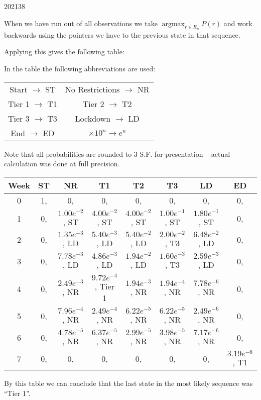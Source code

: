 \documentclass[10pt,\jkfside,a4paper]{article}
\DeclareMathOperator*{\argmax}{argmax}
\begin{document}
\begin{examquestion}{2021}{3}{8}
\begin{enumerate}
When we have run out of all observations we take $\argmax_{r \in R_n} P(r)$ and work backwards using the 
pointers we have to the previous state in that sequence.

Applying this gives the following table:

In the table the following abbreviations are used:

\begin{tabular}{c c}
Start $\rightarrow$ ST & No Restrictions $\rightarrow$ NR \\
Tier 1 $\rightarrow$ T1 & Tier 2 $\rightarrow$ T2 \\
Tier 3 $\rightarrow$ T3 & Lockdown $\rightarrow$ LD \\
End $\rightarrow$ ED & $\times 10^{n} \rightarrow e^{n}$ \\
\end{tabular}

Note that all probabilities are rounded to 3 S.F. for presentation -- actual calculation was 
done at full precision.

\begin{tabular}{|c| c c c c c c c|}
\hline
Week & ST & NR & T1 & T2 & T3 & LD & ED \\
\hline
0 & 1, \null & 0, \null & 0, \null & 0, \null & 0, \null & 0, \null & 0, \null \\
1 & 0, \null & $1.00e^{-2}$, ST & $4.00e^{-2}$, ST & $4.00e^{-2}$, ST & $1.00e^{-1}$, ST & $1.80e^{-1}$, ST & 0, \null \\
2 & 0, \null & $1.35e^{-3}$, LD & $5.40e^{-3}$, LD & $5.40e^{-2}$, LD & $2.00e^{-2}$, T3 & $6.48e^{-2}$, LD & 0, \null \\
3 & 0, \null & $7.78e^{-3}$, LD & $4.86e^{-3}$, LD & $1.94e^{-2}$, LD & $1.60e^{-3}$, T3 & $2.59e^{-3}$, LD & 0, \null \\
4 & 0, \null & $2.49e^{-3}$, NR & $9.72e^{-4}$, Tier 1 & $1.94e^{-3}$, NR & $1.94e^{-4}$, NR & $7.78e^{-6}$, NR & 0, \null \\
5 & 0, \null & $7.96e^{-4}$, NR & $2.49e^{-4}$, NR & $6.22e^{-5}$, NR & $6.22e^{-5}$, NR & $2.49e^{-6}$, NR & 0, \null \\
6 & 0, \null & $4.78 e^{-5}$, NR & $6.37e^{-5}$, NR & $2.99e^{-5}$, NR & $3.98e^{-5}$, NR & $7.17e^{-6}$, NR & 0, \null \\
7 & 0, \null & 0, \null & 0, \null & 0, \null & 0, \null & 0, \null & $3.19e^{-6}$, T1 \\
\hline
\end{tabular}

By this table we can conclude that the last state in the most likely sequence was ``Tier 1''.


\end{enumerate}
\end{examquestion}
\end{document}
